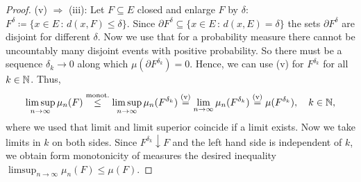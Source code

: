 \begin{proof}[Proof]
	(v) $\Rightarrow$ (iii): Let $F \subseteq E$ closed and enlarge $F$ by $\delta$: $F^{\delta}\coloneqq \{ x\in E \,:\, d(x,F) \leq \delta \}$. Since $\partial F^{\delta} \subseteq \{ x\in E \,:\, d(x,E) = \delta \}$ the sets $\partial F^{\delta}$ are disjoint for different $\delta$. Now we use that for a probability measure there cannot be uncountably many disjoint events with positive probability. So there must be a sequence $\delta_k \to 0$ along which $\mu(\partial F^{\delta_k}) = 0$. Hence, we can use (v) for $F^{\delta_k}$ for all $k\in \mathbb{N}$. Thus, 
	\begin{align*}
		\limsup_{n\to\infty}\mu_n(F) \overset{\text{monot.}}{\leq} \limsup_{n\to\infty} \mu_n(F^{\delta_k}) \overset{\text{(v)}}{=}\lim_{n\to\infty}\mu_n(F^{\delta_k}) \overset{\text{(v)}}{=} \mu(F^{\delta_k}),\quad k\in\mathbb{N},
	\end{align*}
	where we used that limit and limit superior coincide if a limit exists. Now we take limits in $k$ on both sides. Since $F^{\delta_k}\downarrow F$ and the left hand side is independent of $k$, we obtain form monotonicity of measures the desired inequality $\limsup_{n\to\infty}\mu_n(F) \leq \mu(F)$. \smallskip
	

\end{proof}
